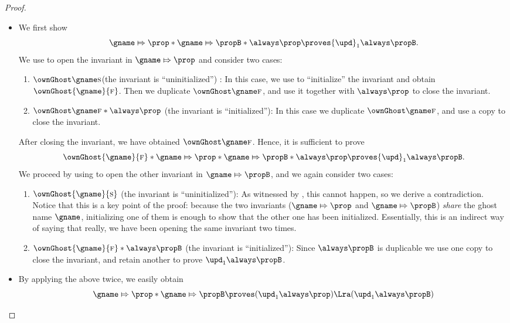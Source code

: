 \begin{proof}%
\begin{itemize}
  \item We first show
    \[\gname \Mapsto \prop * \gname \Mapsto \propB * \always \prop \proves {\upd}_1 \always \propB.\]
    We use  to open the invariant in $\gname \Mapsto \prop$ and consider two cases:
    \begin{enumerate}
    \item $\ownGhost \gname \starttoken$(the invariant is ``uninitialized'') : In this case, we use  to ``initialize'' the invariant and obtain $\ownGhost{\gname}{\finishtoken}$.
      Then we duplicate $\ownGhost \gname \finishtoken$, and use it together with $\always \prop$ to close the invariant.
    \item $\ownGhost \gname \finishtoken * \always \prop$ (the invariant is ``initialized''): In this case we duplicate $\ownGhost \gname \finishtoken$, and use a copy to close the invariant.
    \end{enumerate}
    After closing the invariant, we have obtained $\ownGhost \gname \finishtoken$.
    Hence, it is sufficient to prove
    \[
      \ownGhost{\gname}{\finishtoken} * \gname \Mapsto \prop * \gname \Mapsto \propB * \always \prop \proves {\upd}_1 \always \propB.\]
    We proceed by using  to open the other invariant in $\gname \Mapsto \propB$, and we again consider two cases:
    \begin{enumerate}
    \item $\ownGhost{\gname}{\starttoken}$ (the invariant is ``uninitialized''): As witnessed by , this cannot happen, so we derive a contradiction.
      Notice that this is a key point of the proof: because the two invariants ($\gname \Mapsto \prop$ and $\gname \Mapsto \propB$) \emph{share} the ghost name $\gname$, initializing one of them is enough to show that the other one has been initialized.
      Essentially, this is an indirect way of saying that really, we have been opening the same invariant two times.
    \item $\ownGhost{\gname}{\finishtoken} * \always \propB$ (the invariant is ``initialized''):
      Since $\always \propB$ is duplicable we use one copy to close the invariant, and retain another to prove ${\upd}_1 \always \propB$.
    \end{enumerate}
\item By applying the above twice, we easily obtain
\[ \gname \Mapsto \prop * \gname \Mapsto \propB \proves ({\upd}_1 \always \prop) \Lra ({\upd}_1 \always \propB) \]
\end{itemize}
\end{proof}
